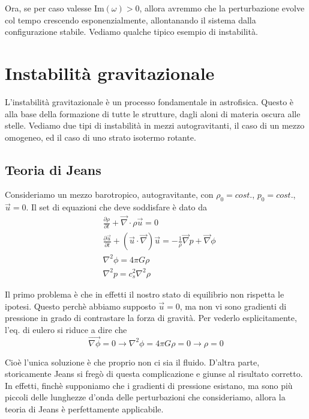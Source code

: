 \documentclass{report}
\begin{document}
Ora, se per caso valesse $\text{Im}(\omega) > 0$, allora avremmo che la perturbazione evolve col tempo crescendo esponenzialmente, allontanando il sistema dalla configurazione stabile. Vediamo qualche tipico esempio di instabilità. 

\section{Instabilità gravitazionale}

L'instabilità gravitazionale è un processo fondamentale in astrofisica. Questo è alla base della formazione di tutte le strutture, dagli aloni di materia oscura alle stelle. Vediamo due tipi di instabilità in mezzi autogravitanti, il caso di un mezzo omogeneo, ed il caso di uno strato isotermo rotante. 

\subsection{Teoria di Jeans}

Consideriamo un mezzo barotropico, autogravitante, con $\rho_0 = cost.$, $p_0 = cost.$, $\vec{u}=0$. Il set di equazioni che deve soddisfare è dato da 
\begin{align}
    &\frac{\partial \rho}{\partial t} + \vec{\nabla}\cdot \rho \vec{u} = 0 \\
    & \frac{\partial \vec{u}}{\partial t} + (\vec{u}\cdot \vec{\nabla})\vec{u} = -\frac{1}{\rho}\vec{\nabla}p + \vec{\nabla}\phi \\
    & \nabla^2\phi = 4\pi G\rho \\ 
    & \nabla^2p = c_s^2\nabla^2\rho
\end{align}

Il primo problema è che in effetti il nostro stato di equilibrio non rispetta le ipotesi. Questo perchè abbiamo supposto $\vec{u}=0$, ma non vi sono gradienti di pressione in grado di contrastare la forza di gravità. Per vederlo esplicitamente, l'eq. di eulero si riduce a dire che 
\begin{equation}
    \vec{\nabla\phi} = 0 \rightarrow \nabla^2 \phi = 4\pi G\rho =0 \rightarrow \rho =0
\end{equation}

Cioè l'unica soluzione è che proprio non ci sia il fluido. D'altra parte, storicamente Jeans si fregò di questa complicazione e giunse al risultato corretto. In effetti, finchè supponiamo che i gradienti di pressione esistano, ma sono più piccoli delle lunghezze d'onda delle perturbazioni che consideriamo, allora la teoria di Jeans è perfettamente applicabile. \\
\end{document}
